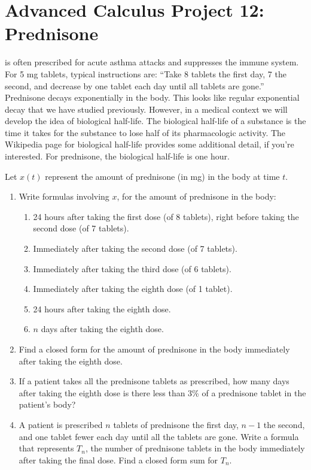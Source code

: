 \documentclass
[justified,nohyper]
{tufte-handout}
\begin{document}
\section{Advanced Calculus Project 12: Prednisone}

 is often prescribed for acute asthma attacks and suppresses the immune system. For 5 mg tablets, typical instructions are: ``Take 8 tablets the first day, 7 the second, and decrease by one tablet each day until all tablets are gone.'' Prednisone decays exponentially in the body. This looks like regular exponential decay that we have studied previously. However, in a medical context we will develop the idea of biological half-life. The biological half-life of a substance is the time it takes for the substance to lose half of its pharmacologic activity. The Wikipedia page for biological half-life provides some additional detail, if you're interested. For prednisone, the biological half-life is one hour.

Let $x(t)$ represent the amount of prednisone (in mg) in the body at time $t$.

\begin{enumerate}
  \item Write formulas involving $x$, for the amount of prednisone in the body:
  \begin{enumerate}
  \item 24 hours after taking the first dose (of 8 tablets), right before taking the second dose (of 7 tablets).
  \item Immediately after taking the second dose (of 7 tablets).
  \item Immediately after taking the third dose (of 6 tablets).
  \item Immediately after taking the eighth dose (of 1 tablet).
  \item 24 hours after taking the eighth dose.
  \item $n$ days after taking the eighth dose.
\end{enumerate}
    \item Find a closed form for the amount of prednisone in the body immediately after taking the eighth dose.
    \item If a patient takes all the prednisone tablets as prescribed, how many days after taking the eighth dose is there less than 3\% of a prednisone tablet in the patient's body?
    \item A patient is prescribed $n$ tablets of prednisone the first day, $n-1$ the second, and one tablet fewer each day until all the tablets are gone. Write a formula that represents $T_n$, the number of prednisone tablets in the body immediately after taking the final dose. Find a closed form sum for $T_n$.

\end{enumerate}
\end{document}
